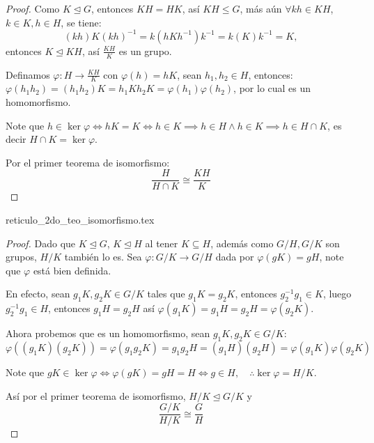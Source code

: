 \begin{proof}
	Como $K \trianglelefteq G$, entonces $KH = HK$, así $KH \le G$, más aún $\forall kh \in KH$, $k \in K, h \in H$, se tiene:
	\begin{equation*}
		(kh) K (kh)^{-1} = k(h K h^{-1})k^{-1} = k(K)k^{-1} = K,
	\end{equation*}
	entonces $K \trianglelefteq KH$, así $\frac{KH}{K}$ es un grupo.

	Definamos $\varphi: H \to \frac{KH}{K}$ con $\varphi(h) = hK$, sean $h_1, h_2 \in H$, entonces: $\varphi(h_1 h_2) = (h_1 h_2)K = h_1 K h_2 K = \varphi(h_1)\varphi(h_2)$, por lo cual es un homomorfismo.

	Note que $h \in \ker \varphi \iff hK = K \iff h \in K \implies h \in H \land h \in K \implies h \in H \cap K$, es decir $H \cap K = \ker \varphi$.

	Por el primer teorema de isomorfismo:
	\begin{equation*}
		\frac{H}{H \cap K} \cong \frac{KH}{K}
	\end{equation*}
\end{proof}

{reticulo_2do_teo_isomorfismo.tex}


\begin{proof}
	Dado que $K \trianglelefteq G$, $K \trianglelefteq H$ al tener $K \subseteq H$, además como $G/H, G/K$ son grupos, $H/K$ también lo es. Sea $\varphi: G/K \to G/H$ dada por $\varphi(gK) = gH$, note que $\varphi$ está bien definida.

	En efecto, sean $g_1 K, g_2 K \in G/K$ tales que $g_1 K = g_2 K$, entonces $g_2^{-1}g_1 \in K$, luego $g_2^{-1}g_1 \in H$, entonces $g_1 H = g_2 H$ así $\varphi(g_1 K) = g_1 H = g_2 H = \varphi(g_2 K)$.

	Ahora probemos que es un homomorfismo, sean $g_1 K, g_2 K \in G/K$:
	\begin{equation*}
		\varphi((g_1 K)(g_2 K)) = \varphi(g_1 g_2 K) = g_1 g_2 H = (g_1 H)(g_2 H) = \varphi(g_1 K)\varphi(g_2 K)
	\end{equation*}

	Note que $gK \in \ker \varphi \iff \varphi(gK) = gH = H \iff g \in H, \quad \therefore \ker \varphi = H/K$.

	Así por el primer teorema de isomorfismo, $H/K \trianglelefteq G/K$ y
	\begin{equation*}
		\frac{G/K}{H/K} \cong \frac{G}{H}
	\end{equation*}
\end{proof}

